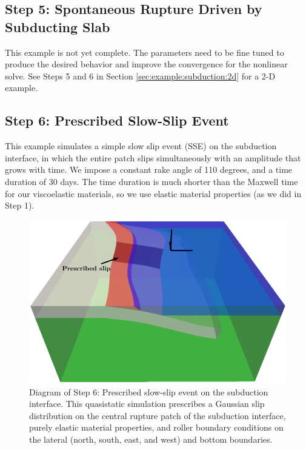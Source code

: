 \subsection{Step 5: Spontaneous Rupture Driven by Subducting Slab}

This example is not yet complete. The parameters need to be fine tuned
to produce the desired behavior and improve the convergence for the
nonlinear solve. See Steps 5 and 6 in Section
\vref{sec:example:subduction:2d} for a 2-D example.

\subsection{Step 6: Prescribed Slow-Slip Event}

This example simulates a simple slow slip event (SSE) on the
subduction interface, in which the entire patch slips simultaneously
with an amplitude that grows with time. We impose a constant rake
angle of 110 degrees, and a time duration of 30 days. The time
duration is much shorter than the Maxwell time for our viscoelastic
materials, so we use elastic material properties (as we did in Step 1).

\begin{figure}[htbp]
  \includegraphics[scale=0.75]{examples/figs/subduction3d_step06_diagram}
  \caption{Diagram of Step 6: Prescribed slow-slip event on the
    subduction interface. This quasistatic simulation prescribes a
    Gaussian slip distribution on the central rupture patch of the
    subduction interface, purely elastic material properties, and
    roller boundary conditions on the lateral (north, south, east, and
    west) and bottom boundaries.}
  \label{fig:example:subduction:3d:step06:diagram}
\end{figure}


